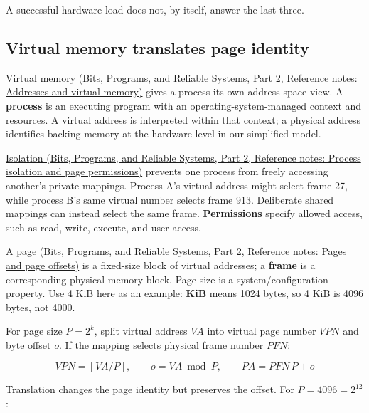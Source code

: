 A successful hardware load does not, by itself, answer the last three.

\subsection{Virtual memory translates page identity}\label{05-engine-i-ch002-virtual-memory-translates-page-identity}

\hypertarget{05-engine-i-ch002-virtual-memory-translates-page-identity}{}

\href{../01-Bits-Programs-and-Reliable-Systems-P02/main.pdf\#nameddest=appendix-18ee4f913c3c}{Virtual memory (Bits, Programs, and Reliable Systems, Part 2, Reference notes: Addresses and virtual memory)} gives a process its own address-space view. A \textbf{process} is an executing program with an operating-system-managed context and resources. A virtual address is interpreted within that context; a physical address identifies backing memory at the hardware level in our simplified model.

\href{../01-Bits-Programs-and-Reliable-Systems-P02/main.pdf\#nameddest=appendix-c2a9ad1e2b49}{Isolation (Bits, Programs, and Reliable Systems, Part 2, Reference notes: Process isolation and page permissions)} prevents one process from freely accessing another's private mappings. Process A's virtual address  might select frame 27, while process B's same virtual number selects frame 913. Deliberate shared mappings can instead select the same frame. \textbf{Permissions} specify allowed access, such as read, write, execute, and user access.

A \href{../01-Bits-Programs-and-Reliable-Systems-P02/main.pdf\#nameddest=appendix-0c67cd5bf30a}{page (Bits, Programs, and Reliable Systems, Part 2, Reference notes: Pages and page offsets)} is a fixed-size block of virtual addresses; a \textbf{frame} is a corresponding physical-memory block. Page size is a system/configuration property. Use 4 KiB here as an example: \textbf{KiB} means 1024 bytes, so 4 KiB is 4096 bytes, not 4000.

For page size \(P=2^k\), split virtual address \(VA\) into virtual page number \(VPN\) and byte offset \(o\). If the mapping selects physical frame number \(PFN\):

\[
VPN=\left\lfloor VA/P\right\rfloor,\qquad
o=VA\bmod P,\qquad
PA=PFN\,P+o
\]

Translation changes the page identity but preserves the offset. For \(P=4096=2^{12}\):

